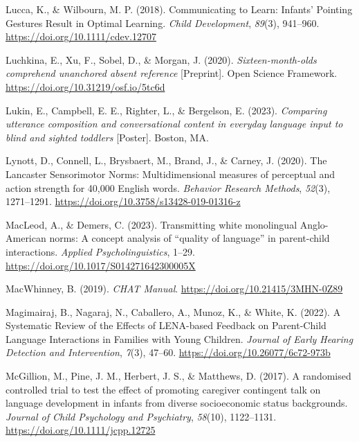 \documentclass[
  man,floatsintext]{apa6}
\newlength{\cslhangindent}
\newlength{\cslentryspacingunit} %
\newenvironment{CSLReferences}[2] %
 {%
  \setlength{\parindent}{0pt}
  \ifodd #1
  \let\oldpar\par
  \def\par{\hangindent=\cslhangindent\oldpar}
  \fi
  \setlength{\parskip}{#2\cslentryspacingunit}
 }%
 {}
\begin{document}
\begin{CSLReferences}{1}{0}
\leavevmode{}%
Lucca, K., \& Wilbourn, M. P. (2018). Communicating to {Learn}: {Infants}' {Pointing Gestures Result} in {Optimal Learning}. \emph{Child Development}, \emph{89}(3), 941--960. \url{https://doi.org/10.1111/cdev.12707}

\leavevmode{}%
Luchkina, E., Xu, F., Sobel, D., \& Morgan, J. (2020). \emph{Sixteen-month-olds comprehend unanchored absent reference} {[}Preprint{]}. Open Science Framework. \url{https://doi.org/10.31219/osf.io/5tc6d}

\leavevmode{}%
Lukin, E., Campbell, E. E., Righter, L., \& Bergelson, E. (2023). \emph{Comparing utterance composition and conversational content in everyday language input to blind and sighted toddlers} {[}Poster{]}. Boston, MA.

\leavevmode{}%
Lynott, D., Connell, L., Brysbaert, M., Brand, J., \& Carney, J. (2020). The {Lancaster Sensorimotor Norms}: Multidimensional measures of perceptual and action strength for 40,000 {English} words. \emph{Behavior Research Methods}, \emph{52}(3), 1271--1291. \url{https://doi.org/10.3758/s13428-019-01316-z}

\leavevmode{}%
MacLeod, A., \& Demers, C. (2023). Transmitting white monolingual {Anglo-American} norms: {A} concept analysis of {``quality of language''} in parent-child interactions. \emph{Applied Psycholinguistics}, 1--29. \url{https://doi.org/10.1017/S014271642300005X}

\leavevmode{}%
MacWhinney, B. (2019). \emph{{CHAT Manual}}. \url{https://doi.org/10.21415/3MHN-0Z89}

\leavevmode{}%
Magimairaj, B., Nagaraj, N., Caballero, A., Munoz, K., \& White, K. (2022). A {Systematic Review} of the {Effects} of {LENA-based Feedback} on {Parent-Child Language Interactions} in {Families} with {Young Children}. \emph{Journal of Early Hearing Detection and Intervention}, \emph{7}(3), 47--60. \url{https://doi.org/10.26077/6c72-973b}

\leavevmode{}%
McGillion, M., Pine, J. M., Herbert, J. S., \& Matthews, D. (2017). A randomised controlled trial to test the effect of promoting caregiver contingent talk on language development in infants from diverse socioeconomic status backgrounds. \emph{Journal of Child Psychology and Psychiatry}, \emph{58}(10), 1122--1131. \url{https://doi.org/10.1111/jcpp.12725}


\end{CSLReferences}
\end{document}
